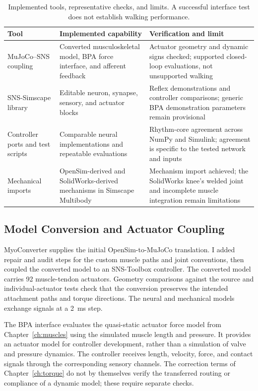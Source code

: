 \begin{table}[htbp]
\caption[Neuromechanical tools and verification scope]{Implemented tools, representative checks, and limits. A successful interface test does not establish walking performance.}
\label{tab:sns_capability}
\small
\begin{tabularx}{\textwidth}{@{}>{\raggedright\arraybackslash}p{}>{\raggedright\arraybackslash}p{}>{\raggedright\arraybackslash}X@{}}
\toprule
\textbf{Tool} & \textbf{Implemented capability} & \textbf{Verification and limit} \\
\midrule
MuJoCo--SNS coupling & Converted musculoskeletal model, BPA force interface, and afferent feedback & Actuator geometry and dynamic signs checked; supported closed-loop evaluations, not unsupported walking \\
SNS-Simscape library & Editable neuron, synapse, sensory, and actuator blocks & Reflex demonstrations and controller comparisons; generic BPA demonstration parameters remain provisional \\
Controller ports and test scripts & Comparable neural implementations and repeatable evaluations & Rhythm-core agreement across NumPy and Simulink; agreement is specific to the tested network and inputs \\
Mechanical imports & OpenSim-derived and SolidWorks-derived mechanisms in Simscape Multibody & Mechanism import achieved; the SolidWorks knee's welded joint and incomplete muscle integration remain limitations \\
\bottomrule
\end{tabularx}
\end{table}

\subsection{Model Conversion and Actuator Coupling}\label{sec:sns_existing_tools}

MyoConverter supplies the initial OpenSim-to-MuJoCo translation. I added repair and audit steps for the custom muscle paths and joint conventions, then coupled the converted model to an SNS-Toolbox controller. The converted model carries 92 muscle-tendon actuators. Geometry comparisons against the source and individual-actuator tests check that the conversion preserves the intended attachment paths and torque directions. The neural and mechanical models exchange signals at a \qty{2}{\milli\second} step.

The BPA interface evaluates the quasi-static actuator force model from Chapter~\ref{ch:muscles} using the simulated muscle length and pressure. It provides an actuator model for controller development, rather than a simulation of valve and pressure dynamics. The controller receives length, velocity, force, and contact signals through the corresponding sensory channels. The correction terms of Chapter~\ref{ch:torque} do not by themselves verify the transferred routing or compliance of a dynamic model; these require separate checks.

